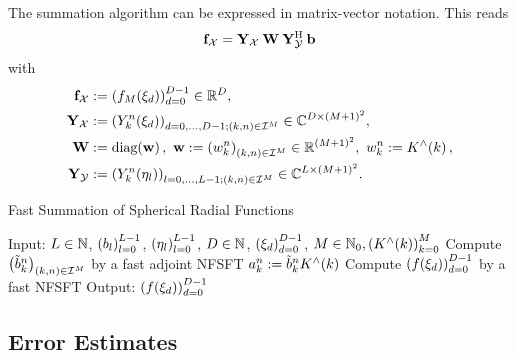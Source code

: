 \begin{remark}
	The summation algorithm can be expressed in matrix-vector notation. This reads
	\[
	  \mathbf{f}_{\mathcal{X}} = \mathbf{Y}_{\mathcal{X}} \: \mathbf{W} \:
	  \mathbf{Y}_{\mathcal{Y}}^{\text{\rm{H}}} \: \mathbf{b}
	\]
	with
	\begin{align}
	  \nonumber
	  \mathbf{f}_{\mathcal{X}} & := \left(f_{M}{\hspace{-0.4ex}}\left(\mathbf{\xi}_{d}\right)\right)_{d=0}^{D-1} \in \mathbb{R}^D,\\
	  \nonumber
	  \mathbf{Y}_{\mathcal{X}} & := \left(Y_k^n{\hspace{-0.4ex}}\left(\mathbf{\xi}_{d}\right)\right)_{d=0,\ldots,D-1; 
	  \left(k,n\right) \in \mathcal{I}^M} \in \mathbb{C}^{D \times \left(M+1\right)^2}, \\
	  \nonumber
	  \mathbf{W} & := \text{\rm{diag}}{\hspace{-0.4ex}}\left(\mathbf{w}\right),\ \mathbf{w} := \left(w_{k}^n\right)_{\left(k,n\right) \in 
	  \mathcal{I}^M} \in \mathbb{R}^{(M+1)^2},\ w_{k}^n := K^{\wedge}{\hspace{-0.4ex}}\left(k\right), \\
	  \nonumber
	  \mathbf{Y}_{\mathcal{Y}} & := \left(Y_k^n{\hspace{-0.4ex}}\left(\mathbf{\eta}_{l}\right)\right)_{l=0,\ldots,L-1;
	  \left(k,n\right) \in \mathcal{I}^M} \in \mathbb{C}^{L \times \left(M+1\right)^2}.
	\end{align}
\end{remark}

\begin{algorithm}[tb]
  \caption{Fast Summation of Spherical Radial Functions}
  \label{Applications:Algorithm:FastSummation}    
  \begin{algorithmic}
    \STATE  Input:  $L \in \mathbb{N}$, $\left(b_{l}\right)_{l=0}^{L-1}$, 
    $\left(\mathbf{\eta}_{l}\right)_{l=0}^{L-1}$, $D \in \mathbb{N}$, 
    $\left(\mathbf{\xi}_{d}\right)_{d=0}^{D-1}$, $M \in \mathbb{N}_{0}, 
    \left(K^{\wedge}{\hspace{-0.4ex}}\left(k\right)\right)_{k=0}^M$
    \STATE
    \STATE Compute $\left(\tilde{b}_{k}^n\right)_{\left(k,n\right) \in \mathcal{I}^M}$ 
    by a fast adjoint NFSFT
    \STATE 
        \STATE $a_{k}^n := \tilde{b}_{k}^n K^{\wedge}{\hspace{-0.4ex}}\left(k\right)$
      \ENDFOR
    \ENDFOR
    \STATE
    \STATE Compute $\left(f{\hspace{-0.4ex}}\left(\mathbf{\xi}_{d}\right)\right)_{d=0}^{D-1}$ by a fast NFSFT
    \STATE
    \STATE Output: $\left(f{\hspace{-0.4ex}}\left(\mathbf{\xi}_{d}\right)\right)_{d=0}^{D-1}$
\end{algorithmic}
\end{algorithm}

\subsection{Error Estimates}

